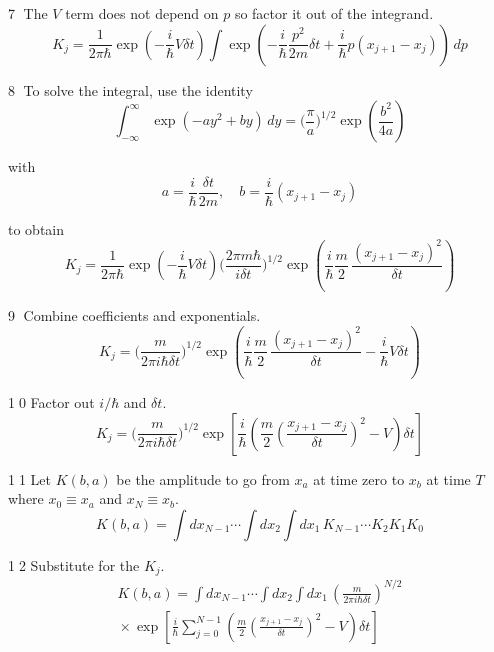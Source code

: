 \documentclass[12pt]{article}
\begin{document}
\textcircled{\scriptsize7}
The $V$ term does not depend on $p$ so factor it out of the integrand.
\begin{equation*}
K_j=\frac{1}{2\pi\hbar}
\exp\left(-\frac{i}{\hbar}V\delta t\right)
\int\exp\left(-\frac{i}{\hbar}
\frac{p^2}{2m}
\delta t
+\frac{i}{\hbar}p(x_{j+1}-x_j)\right)
\,dp
\end{equation*}

\textcircled{\scriptsize8}
To solve the integral, use the identity
\begin{equation*}
\int_{-\infty}^\infty\exp(-ay^2+by)\,dy=\biggl(\frac{\pi}{a}\biggr)^{1/2}
\exp\left(\frac{b^2}{4a}\right)
\end{equation*}

with
\begin{equation*}
a=\frac{i}{\hbar}\frac{\delta t}{2m},\quad b=\frac{i}{\hbar}(x_{j+1}-x_j)
\end{equation*}

to obtain
\begin{equation*}
K_j=\frac{1}{2\pi\hbar}
\exp\left(-\frac{i}{\hbar}V\delta t\right)
\biggl(\frac{2\pi m\hbar}{i\delta t}\biggr)^{1/2}
\exp\left(\frac{i}{\hbar}\frac{m}{2}\,\frac{(x_{j+1}-x_j)^2}{\delta t}\right)
\end{equation*}

\textcircled{\scriptsize9}
Combine coefficients and exponentials.
\begin{equation*}
K_j=\biggl(\frac{m}{2\pi i\hbar\delta t}\biggr)^{1/2}
\exp\left(\frac{i}{\hbar}\frac{m}{2}\,\frac{(x_{j+1}-x_j)^2}{\delta t}-\frac{i}{\hbar}V\delta t\right)
\end{equation*}

\textcircled{\scriptsize10}
Factor out $i/\hbar$ and $\delta t$.
\begin{equation*}
K_j=\biggl(\frac{m}{2\pi i\hbar\delta t}\biggr)^{1/2}
\exp\left[\frac{i}{\hbar}
\left(\frac{m}{2}\left(\frac{x_{j+1}-x_j}{\delta t}\right)^2-V\right)\delta t
\right]
\end{equation*}

\textcircled{\scriptsize11}
Let $K(b,a)$ be the amplitude to go from $x_a$ at time zero to
$x_b$ at time $T$ where $x_0\equiv x_a$ and $x_N\equiv x_b$.
\begin{equation*}
K(b,a)=\int dx_{N-1}\cdots\int dx_2\int dx_1\,
K_{N-1}\cdots K_2K_1K_0
\end{equation*}

\textcircled{\scriptsize12}
Substitute for the $K_j$.
\begin{multline*}
K(b,a)=\int dx_{N-1}\cdots\int dx_2\int dx_1\,
\left(\frac{m}{2\pi i\hbar\delta t}\right)^{N/2}
\\
{}\times
\exp\left[
\frac{i}{\hbar}\sum_{j=0}^{N-1}\left(
\frac{m}{2}\left(\frac{x_{j+1}-x_j}{\delta t}\right)^2
-V\right)\delta t
\right]
\end{multline*}
\end{document}
